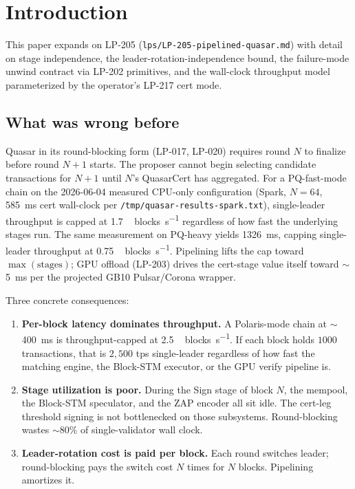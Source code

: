 \section{Introduction}

This paper expands on LP-205
(\texttt{lps/LP-205-pipelined-quasar.md}) with detail on stage
independence, the leader-rotation-independence bound, the
failure-mode unwind contract via LP-202 primitives, and the
wall-clock throughput model parameterized by the operator's LP-217
cert mode.

\subsection{What was wrong before}

Quasar in its round-blocking form (LP-017, LP-020) requires round
$N$ to finalize before round $N{+}1$ starts. The proposer cannot
begin selecting candidate transactions for $N{+}1$ until $N$'s
QuasarCert has aggregated. For a PQ-fast-mode chain on the
2026-06-04 measured CPU-only configuration (Spark, $N{=}64$,
\SI{585}{\milli\second} cert wall-clock per
\texttt{/tmp/quasar-results-spark.txt}), single-leader throughput
is capped at \SI{1.7}{\,blocks\per\second} regardless of how fast
the underlying stages run. The same measurement on PQ-heavy yields
\SI{1326}{\milli\second}, capping single-leader throughput at
\SI{0.75}{\,blocks\per\second}. Pipelining lifts the cap toward
$\max(\textrm{stages})$; GPU offload (LP-203) drives the
cert-stage value itself toward $\sim$\SI{5}{\milli\second} per
the projected GB10 Pulsar/Corona wrapper.

Three concrete consequences:

\begin{enumerate}[leftmargin=2em,nosep]
\item \textbf{Per-block latency dominates throughput.} A
  Polaris-mode chain at $\sim$\SI{400}{\milli\second} is
  throughput-capped at \SI{2.5}{\,blocks\per\second}. If each block
  holds $1000$ transactions, that is $2{,}500$ tps single-leader
  regardless of how fast the matching engine, the Block-STM
  executor, or the GPU verify pipeline is.
\item \textbf{Stage utilization is poor.} During the Sign stage of
  block $N$, the mempool, the Block-STM speculator, and the ZAP
  encoder all sit idle. The cert-leg threshold signing is not
  bottlenecked on those subsystems. Round-blocking wastes
  $\sim 80\%$ of single-validator wall clock.
\item \textbf{Leader-rotation cost is paid per block.} Each round
  switches leader; round-blocking pays the switch cost $N$ times
  for $N$ blocks. Pipelining amortizes it.
\end{enumerate}

